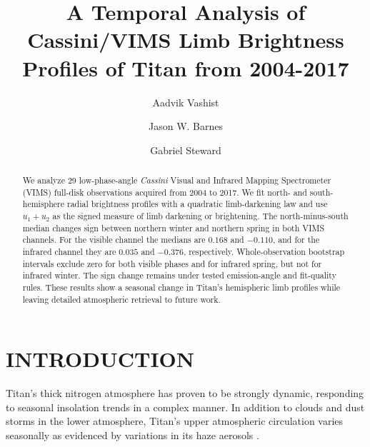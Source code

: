 \documentclass[tighten,linenumbers,twocolumn]{aastex631}
\begin{document}
\title{A Temporal Analysis of Cassini/VIMS Limb Brightness Profiles of Titan from 2004-2017}
\author[0000-0002-6318-7226]{Aadvik Vashist}
\author[0000-0002-7755-3530]{Jason W. Barnes}
\author[0000-0002-8482-4669]{Gabriel Steward}





\begin{abstract}
We analyze 29 low-phase-angle \textit{Cassini} Visual and Infrared Mapping Spectrometer (VIMS) full-disk observations acquired from 2004 to 2017. We fit north- and south-hemisphere radial brightness profiles with a quadratic limb-darkening law and use $u_1+u_2$ as the signed measure of limb darkening or brightening. The north-minus-south median changes sign between northern winter and northern spring in both VIMS channels. For the visible channel the medians are $0.168$ and $-0.110$, and for the infrared channel they are $0.035$ and $-0.376$, respectively. Whole-observation bootstrap intervals exclude zero for both visible phases and for infrared spring, but not for infrared winter. The sign change remains under tested emission-angle and fit-quality rules. These results show a seasonal change in Titan's hemispheric limb profiles while leaving detailed atmospheric retrieval to future work.

\end{abstract}


\section{INTRODUCTION}

Titan's thick nitrogen atmosphere has proven to be strongly dynamic, responding to seasonal insolation trends in a complex manner.  In addition to clouds \citep{Rodriguez2009Global, Schaller_etal09, Griffith2009Characterization, Brown2010Clouds, VIMSclouds, Rodriguez2011Clouds, Turtle2018Titan} and dust storms \citep{rodriguez2018observational} in the lower atmosphere, Titan's upper atmospheric circulation varies seasonally as evidenced by variations in its haze aerosols \citep{rannou2002wind, Tomasko2005Titan, seignovert2021haze}.
\end{document}
